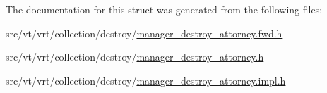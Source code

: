 The documentation for this struct was generated from the following files\+:\begin{DoxyCompactItemize}
\item 
src/vt/vrt/collection/destroy/\hyperlink{manager__destroy__attorney_8fwd_8h}{manager\+\_\+destroy\+\_\+attorney.\+fwd.\+h}\item 
src/vt/vrt/collection/destroy/\hyperlink{manager__destroy__attorney_8h}{manager\+\_\+destroy\+\_\+attorney.\+h}\item 
src/vt/vrt/collection/destroy/\hyperlink{manager__destroy__attorney_8impl_8h}{manager\+\_\+destroy\+\_\+attorney.\+impl.\+h}\end{DoxyCompactItemize}
